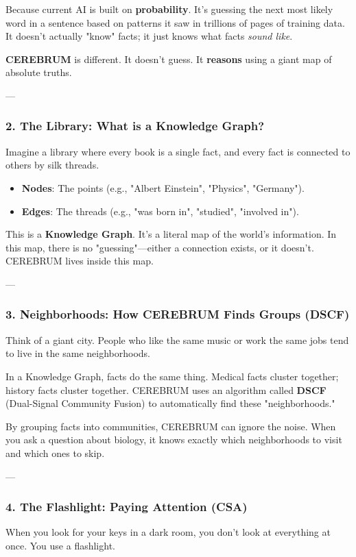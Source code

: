 \documentclass[10pt,journal,compsoc]{IEEEtran}
\begin{document}
Because current AI is built on \textbf{probability}. It’s guessing the next most likely word in a sentence based on patterns it saw in trillions of pages of training data. It doesn't actually "know" facts; it just knows what facts \textit{sound like}.

\textbf{CEREBRUM} is different. It doesn't guess. It \textbf{reasons} using a giant map of absolute truths.

---

\subsubsection{\textbf{2. The Library: What is a Knowledge Graph?}}
Imagine a library where every book is a single fact, and every fact is connected to others by silk threads. 
\begin{itemize}
\item \textbf{Nodes}: The points (e.g., "Albert Einstein", "Physics", "Germany").
\item \textbf{Edges}: The threads (e.g., "was born in", "studied", "involved in").

\end{itemize}
This is a \textbf{Knowledge Graph}. It’s a literal map of the world’s information. In this map, there is no "guessing"—either a connection exists, or it doesn't. CEREBRUM lives inside this map.

---

\subsubsection{\textbf{3. Neighb\-orhoods: How CEREBRUM Finds Groups (DSCF)}}
Think of a giant city. People who like the same music or work the same jobs tend to live in the same neigh\-borhoods. 

In a Knowledge Graph, facts do the same thing. Medical facts cluster together; history facts cluster together. CEREBRUM uses an algorithm called \textbf{DSCF} (Dual-Signal Community Fusion) to autom\-atically find these "neigh\-borhoods." 

By grouping facts into communities, CEREBRUM can ignore the noise. When you ask a question about biology, it knows exactly which neigh\-borhoods to visit and which ones to skip. 

---

\subsubsection{\textbf{4. The Flashlight: Paying Attention (CSA)}}
When you look for your keys in a dark room, you don't look at everything at once. You use a flashlight.
\end{document}
